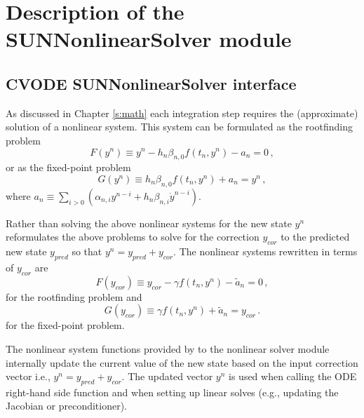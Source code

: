 \chapter{Description of the SUNNonlinearSolver module}\label{c:sunnonlinsol}


\section{CVODE SUNNonlinearSolver interface}
\label{s:sunnonlinsol_interface}

As discussed in Chapter \ref{s:math} each integration step requires the
(approximate) solution of a nonlinear system. This system can be formulated as
the rootfinding problem
\begin{equation}
  F(y^n) \equiv y^n - h_n \beta_{n,0} f(t_n,y^n) - a_n = 0 \, ,
\end{equation}
or as the fixed-point problem
\begin{equation}
  G(y^n) \equiv h_n \beta_{n,0} f(t_n,y^n) + a_n = y^n \, ,
\end{equation}
where $a_n\equiv\sum_{i>0}(\alpha_{n,i}y^{n-i}+h_n\beta_{n,i} {\dot{y}}^{n-i})$.

Rather than solving the above nonlinear systems for the new state $y^n$
{\cvode} reformulates the above problems to solve for the correction $y_{cor}$
to the predicted new state $y_{pred}$ so that $y^n = y_{pred} + y_{cor}$.
The nonlinear systems rewritten in terms of $y_{cor}$ are
\begin{equation} \label{eq:res_corrector}
  F(y_{cor}) \equiv y_{cor} - \gamma f(t_n, y^n) - \tilde{a}_n = 0 \, ,
\end{equation}
for the rootfinding problem and
\begin{equation} \label{eq:fp_corrector}
  G(y_{cor}) \equiv \gamma f(t_n, y^n) + \tilde{a}_n = y_{cor} \, .
\end{equation}
for the fixed-point problem.

The nonlinear system functions provided by {\cvode} to the nonlinear solver
module internally update the current value of the new state based on the input
correction vector i.e., $y^n = y_{pred} + y_{cor}$. The updated vector $y^n$ is
used when calling the ODE right-hand side function and when setting up linear
solves (e.g., updating the Jacobian or preconditioner).

